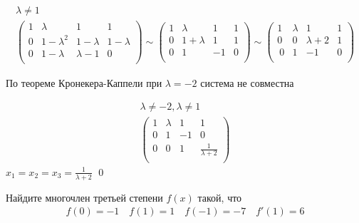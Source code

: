 \begin{sol}
\begin{gather*}
    \lambda \neq 1 \\
    \left(
    \begin{array}{ccc|c}
     1 & \lambda & 1 & 1 \\
     0 & 1  - \lambda^2 & 1 - \lambda & 1 - \lambda \\
     0 & 1 - \lambda & \lambda - 1 & 0 \\
    \end{array}
    \right) \sim 
    \left(
    \begin{array}{ccc|c}
     1 & \lambda & 1 & 1 \\
     0 & 1  + \lambda & 1 & 1 \\
     0 & 1 & -1 & 0 \\
    \end{array}
    \right) \sim
     \left(
    \begin{array}{ccc|c}
     1 & \lambda & 1 & 1 \\
     0 & 0 & \lambda + 2 & 1\\\
     0 & 1 & -1 & 0 \\
    \end{array}
    \right)
\end{gather*}

По теореме Кронекера-Каппели при $\lambda = -2$ система не совместна

\begin{gather*}
    \lambda \neq -2, \lambda \neq 1\\
    \left(
    \begin{array}{ccc|c}
     1 & \lambda & 1 & 1 \\
     0 & 1 & -1 & 0 \\
     0 & 0 & 1 & \frac{1}{\lambda + 2}\\
    \end{array}
    \right)
\end{gather*}
$x_1 = x_2 = x_3 = \frac{1}{\lambda + 2}$
\qed
\end{sol}

\begin{prb}
Найдите многочлен третьей степени $f(x)$ такой, что
\begin{gather*}
    f(0) = -1 \quad 
    f(1) = 1 \quad
    f(-1) = -7 \quad
    f'(1) = 6
\end{gather*}
\end{prb}

